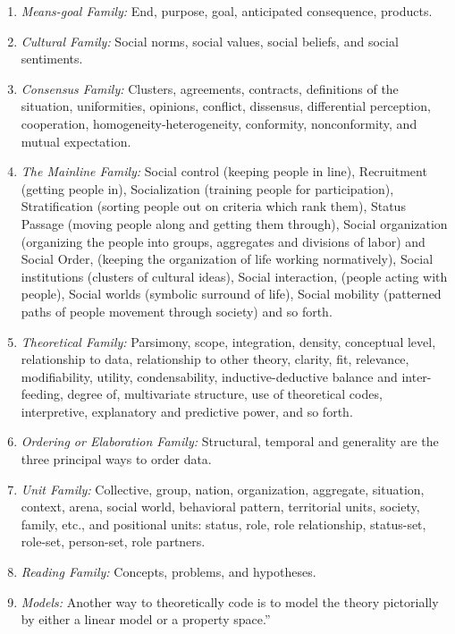 \begin{enumerate}
\item \textit{Means-goal Family:} End, purpose, goal, anticipated consequence, products.
\item \textit{Cultural Family:} Social norms, social values, social beliefs, and social sentiments.
\item \textit{Consensus Family:} Clusters, agreements, contracts, definitions of the situation, uniformities, opinions, conflict, dissensus, differential perception, cooperation, homogeneity-heterogeneity, conformity, nonconformity, and mutual expectation.
\item \textit{The Mainline Family:} Social control (keeping people in line), Recruitment (getting people in), Socialization (training people for participation), Stratification (sorting people out on criteria which rank them), Status Passage (moving people along and getting them through), Social organization (organizing the people into groups, aggregates and divisions of labor) and Social Order, (keeping the organization of life working normatively), Social institutions (clusters of cultural ideas), Social interaction, (people acting with people), Social worlds (symbolic surround of life), Social mobility (patterned paths of people movement through society) and so forth.
\item \textit{Theoretical Family:} Parsimony, scope, integration, density, conceptual level, relationship to data, relationship to other theory, clarity, fit, relevance, modifiability, utility, condensability, inductive-deductive balance and inter-feeding, degree of, multivariate structure, use of theoretical codes, interpretive, explanatory and predictive power, and so forth.
\item \textit{Ordering or Elaboration Family:} Structural, temporal and generality are the three principal ways to order data.
\item \textit{Unit Family:} Collective, group, nation, organization, aggregate, situation, context, arena, social world, behavioral pattern, territorial units, society, family, etc., and positional units: status, role, role relationship, status-set, role-set, person-set, role partners. 
\item \textit{Reading Family:} Concepts, problems, and hypotheses. 
\item \textit{Models:} Another way to theoretically code is to model the theory pictorially by either a linear model or a property space.'' \cite{GlaserTheoreticalSensitivity}
\end{enumerate}

